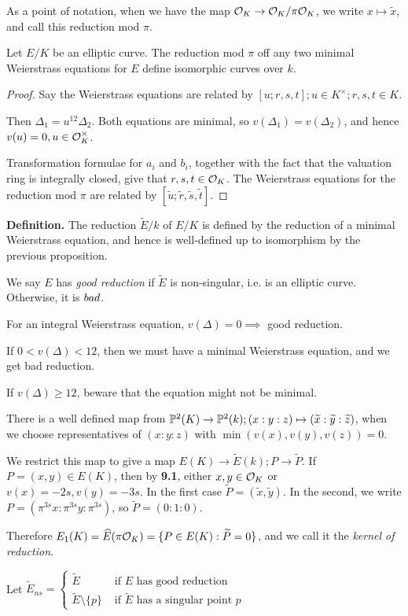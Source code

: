 \documentclass[10pt,a4paper]{article}
\begin{document}
As a point of notation, when we have the map $\O_K \to \O_K/\pi\O_K$, we write $x \mapsto \tilde{x}$, and call this reduction mod $\pi$.
\begin{proposition}
  Let $E/K$ be an elliptic curve. The reduction mod $\pi$ off any two minimal Weierstrass equations for $E$ define isomorphic curves over $k$.
\end{proposition}
\begin{proof}
  Say the Weierstrass equations are related by $[u; r,s,t]; u \in K^\times; r,s,t \in K$.

  Then $\Delta_1 = u^{12}\Delta_2$. Both equations are minimal, so $v(\Delta_1) = v(\Delta_2)$, and hence $v(u) = 0, u \in \O_K^\times$.

  Transformation formulae for $a_i$ and $b_i$, together with the fact that the valuation ring is integrally closed, give that $r, s, t \in \O_K$. The Weierstrass equations for the reduction mod $\pi$ are related by $[\tilde{u}; \tilde{r}, \tilde{s}, \tilde{t}]$.
\end{proof}
\textbf{Definition.} The reduction $\tilde{E}/k$ of $E/K$ is defined by the reduction of a minimal Weierstrass equation, and hence is well-defined up to isomorphism by the previous proposition.

We say $E$ has \emph{good reduction} if $\tilde{E}$ is non-singular, i.e. is an elliptic curve. Otherwise, it is $\emph{bad}$.

For an integral Weierstrass equation, $v(\Delta) = 0 \implies$ good reduction.

If $0 <v(\Delta) < 12$, then we must have a minimal Weierstrass equation, and we get bad reduction.

If $v(\Delta) \geq 12$, beware that the equation might not be minimal.

There is a well defined map from $\P^2(K) \to \P^2(k); (x:y:z)\mapsto (\tilde{x}:\tilde{y}:\tilde{z})$, when we choose representatives of $(x:y:z)$ with $\min(v(x),v(y),v(z)) = 0$.

We restrict this map to give a map $E(K) \to \tilde{E}(k); P \to \tilde{P}$. If $P=(x,y) \in E(K)$, then by \textbf{9.1}, either $x,y \in \O_K$ or $v(x) = -2s, v(y) = -3s$. In the first case $\tilde{P} = (\tilde{x}, \tilde{y})$. In the second, we write $P = (\pi^{3s}x:\pi^{3s}y :\pi^{3s})$, so $\tilde{P} = (0:1:0)$.

Therefore $E_1(K) = \hat{E}(\pi\O_K) = \{P \in E(K) : \tilde{P} = 0\}$, and we call it the \emph{kernel of reduction}.

Let $\tilde{E}_{ns} = \begin{cases} \tilde{E} &\text{ if $E$ has good reduction} \\ \tilde{E}\setminus\{p\} & \text{ if $\tilde{E}$ has a singular point $p$}\end{cases}$
\end{document}
